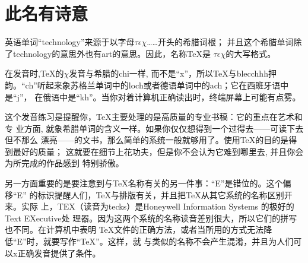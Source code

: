 \chapter{此名有诗意}

英语单词“technology”来源于以字母$\tau\epsilon\chi$……开头的希腊词根；
并且这个希腊单词除了technology的意思外也有art的意思。因此，名称\TeX{}是
$\tau\epsilon\chi$的大写格式。

在发音时,\TeX{}的$\chi$发音与希腊的chi一样, 而不是“x”，所以\TeX{}与blecchhh押
韵。“ch”听起来象苏格兰单词中的loch或者德语单词中的ach；它在西班牙语中是“j”，
在俄语中是“kh”。当你对着计算机正确读出时，终端屏幕上可能有点雾。

这个发音练习是提醒你，\TeX{}主要处理的是高质量的专业书稿：它的重点在艺术和专
业方面, 就象希腊单词的含义一样。如果你仅仅想得到一个过得去——可读下去但不那么
漂亮——的文书，那么简单的系统一般就够用了。使用\TeX{}的目的是得到最好的质量；
这就要在细节上花功夫，但是你不会认为它难到哪里去, 并且你会为所完成的作品感到
特别骄傲。

另一方面重要的是要注意到与\TeX{}名称有关的另一件事：“E”是错位的。这个偏移“E”
的标识提醒人们，\TeX{}与排版有关，并且把\TeX{}从其它系统的名称区别开来。实际
上，TEX（读音为tecks）是Honeywell Information Systems 的极好的Text EXecutive处
理器。因为这两个系统的名称读音差别很大，所以它们的拼写也不同。在计算机中表明
\TeX{}文件的正确方法，或者当所用的方式无法降低“E”时，就要写作“TeX”。这样，就
与类似的名称不会产生混淆，并且为人们可以x正确发音提供了条件。
